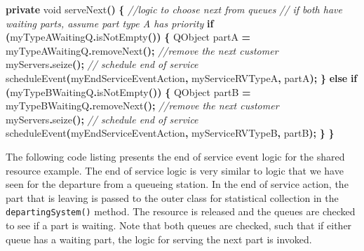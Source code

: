 \documentclass[
]{book}
\newenvironment{Shaded}{\begin{snugshade}}{\end{snugshade}}
\newcommand{\CommentTok}[1]{\textcolor[rgb]{0.56,0.35,0.01}{\textit{#1}}}
\newcommand{\ControlFlowTok}[1]{\textcolor[rgb]{0.13,0.29,0.53}{\textbf{#1}}}
\newcommand{\DataTypeTok}[1]{\textcolor[rgb]{0.13,0.29,0.53}{#1}}
\newcommand{\FunctionTok}[1]{\textcolor[rgb]{0.00,0.00,0.00}{#1}}
\newcommand{\KeywordTok}[1]{\textcolor[rgb]{0.13,0.29,0.53}{\textbf{#1}}}
\newcommand{\NormalTok}[1]{#1}
\newcommand{\OperatorTok}[1]{\textcolor[rgb]{0.81,0.36,0.00}{\textbf{#1}}}
\theoremstyle{definition}
\theoremstyle{definition}
\theoremstyle{definition}
\theoremstyle{definition}
\theoremstyle{remark}
\begin{document}
\begin{Shaded}
\begin{Highlighting}[]
    \KeywordTok{private} \DataTypeTok{void} \FunctionTok{serveNext}\OperatorTok{()} \OperatorTok{\{}
        \CommentTok{//logic to choose next from queues}
        \CommentTok{// if both have waiting parts, assume part type A has priority}
        \ControlFlowTok{if} \OperatorTok{(}\NormalTok{myTypeAWaitingQ}\OperatorTok{.}\FunctionTok{isNotEmpty}\OperatorTok{())} \OperatorTok{\{}
\NormalTok{            QObject partA }\OperatorTok{=}\NormalTok{ myTypeAWaitingQ}\OperatorTok{.}\FunctionTok{removeNext}\OperatorTok{();} \CommentTok{//remove the next customer}
\NormalTok{            myServers}\OperatorTok{.}\FunctionTok{seize}\OperatorTok{();}
            \CommentTok{// schedule end of service}
            \FunctionTok{scheduleEvent}\OperatorTok{(}\NormalTok{myEndServiceEventAction}\OperatorTok{,}\NormalTok{ myServiceRVTypeA}\OperatorTok{,}\NormalTok{ partA}\OperatorTok{);}
        \OperatorTok{\}} \ControlFlowTok{else} \ControlFlowTok{if} \OperatorTok{(}\NormalTok{myTypeBWaitingQ}\OperatorTok{.}\FunctionTok{isNotEmpty}\OperatorTok{())} \OperatorTok{\{}
\NormalTok{            QObject partB }\OperatorTok{=}\NormalTok{ myTypeBWaitingQ}\OperatorTok{.}\FunctionTok{removeNext}\OperatorTok{();} \CommentTok{//remove the next customer}
\NormalTok{            myServers}\OperatorTok{.}\FunctionTok{seize}\OperatorTok{();}
            \CommentTok{// schedule end of service}
            \FunctionTok{scheduleEvent}\OperatorTok{(}\NormalTok{myEndServiceEventAction}\OperatorTok{,}\NormalTok{ myServiceRVTypeB}\OperatorTok{,}\NormalTok{ partB}\OperatorTok{);}
        \OperatorTok{\}}
    \OperatorTok{\}}
\end{Highlighting}
\end{Shaded}

The following code listing presents the end of service event logic for the
shared resource example. The end of service logic is very similar to
logic that we have seen for the departure from a queueing station. In
the end of service action, the part that is leaving is passed to the
outer class for statistical collection in the \texttt{departingSystem()} method.
The resource is released and the queues are checked to see if a part is
waiting. Note that both queues are checked, such that if either queue
has a waiting part, the logic for serving the next part is invoked.
\end{document}
